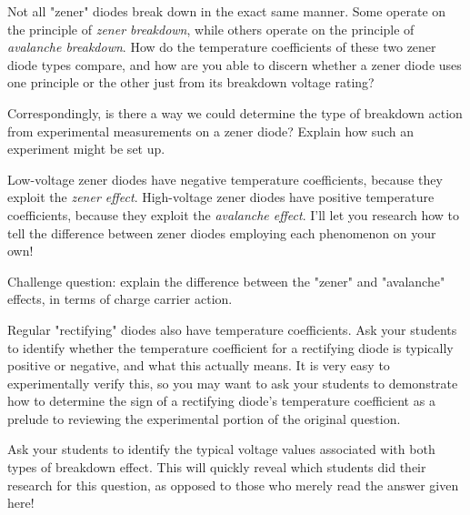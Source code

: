

Not all "zener" diodes break down in the exact same manner.  Some operate on the principle of {\it zener breakdown}, while others operate on the principle of {\it avalanche breakdown}.  How do the temperature coefficients of these two zener diode types compare, and how are you able to discern whether a zener diode uses one principle or the other just from its breakdown voltage rating?

Correspondingly, is there a way we could determine the type of breakdown action from experimental measurements on a zener diode?  Explain how such an experiment might be set up.







Low-voltage zener diodes have negative temperature coefficients, because they exploit the {\it zener effect}.  High-voltage zener diodes have positive temperature coefficients, because they exploit the {\it avalanche effect}.  I'll let you research how to tell the difference between zener diodes employing each phenomenon on your own!

\vskip 10pt

Challenge question: explain the difference between the "zener" and "avalanche" effects, in terms of charge carrier action.







Regular "rectifying" diodes also have temperature coefficients.  Ask your students to identify whether the temperature coefficient for a rectifying diode is typically positive or negative, and what this actually means.  It is very easy to experimentally verify this, so you may want to ask your students to demonstrate how to determine the sign of a rectifying diode's temperature coefficient as a prelude to reviewing the experimental portion of the original question.

Ask your students to identify the typical voltage values associated with both types of breakdown effect.  This will quickly reveal which students did their research for this question, as opposed to those who merely read the answer given here!




